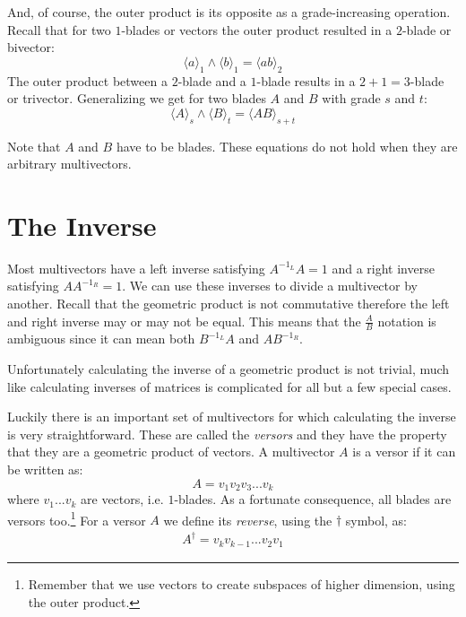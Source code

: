 \documentclass[10pt]{report}
\begin{document}
And, of course, the outer product is its opposite as a
grade-increasing operation. Recall that for two $1$-blades or
vectors the outer product resulted in a $2$-blade or bivector:
\begin{displaymath}
\langle a \rangle_{1} \wedge \langle b \rangle_{1} = \langle ab
\rangle_{2}
\end{displaymath}
The outer product between a $2$-blade and a $1$-blade results in a
$2+1=3$-blade or trivector. Generalizing we get for two blades $A$
and $B$ with grade $s$ and $t$:
\begin{displaymath}
\langle A \rangle_{s} \wedge \langle B \rangle_{t} = \langle AB
\rangle_{s+t}
\end{displaymath}

Note that $A$ and $B$ have to be blades. These equations do not
hold when they are arbitrary multivectors.

\section{The Inverse}

Most multivectors have a left inverse satisfying $A^{-1_{L}}A = 1$
and a right inverse satisfying $AA^{-1_{R}} = 1$. We can use these
inverses to divide a multivector by another. Recall that the
geometric product is not commutative therefore the left and right
inverse may or may not be equal. This means that the $\frac{A}{B}$
notation is ambiguous since it can mean both $B^{-1_{L}}A$ and
$AB^{-1_{R}}$.

Unfortunately calculating the inverse of a geometric product is
not trivial, much like calculating inverses of matrices is
complicated for all but a few special cases.

Luckily there is an important set of multivectors for which
calculating the inverse is very straightforward. These are called
the \emph{versors} and they have the property that they are a
geometric product of vectors. A multivector $A$ is a versor if it
can be written as:
\begin{displaymath}
 A = v_1v_2v_3...v_k
\end{displaymath}
where $v_1...v_k$ are vectors, i.e. $1$-blades. As a fortunate
consequence, all blades are versors too.\footnote{Remember that we
use vectors to create subspaces of higher dimension, using the
outer product.} For a versor $A$ we define its \emph{reverse},
using the $\dagger$ symbol, as:
\begin{align}
    \label{eq:reverse versor}
    A^\dagger = v_kv_{k-1}...v_2v_1
\end{align}
\end{document}
